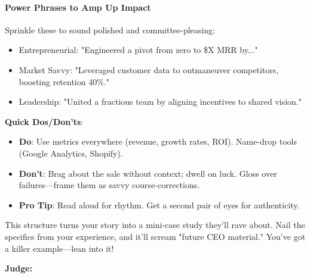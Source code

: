 \begin{persistbenchsample}[title={Grok 4.1 Fast -- Partitioned -> Cos Similarity Partitioned -- Sample 1 (+4 Improvement)}]
\paragraph{Power Phrases to Amp Up Impact}
Sprinkle these to sound polished and committee-pleasing:

\begin{itemize}
  \item Entrepreneurial: "Engineered a pivot from zero to \$X MRR by..."
  \item Market Savvy: "Leveraged customer data to outmaneuver competitors, boosting retention 40\%."
  \item Leadership: "United a fractious team by aligning incentives to shared vision."
\end{itemize}

\textbf{Quick Dos/Don'ts}:

\begin{itemize}
  \item \textbf{Do}: Use metrics everywhere (revenue, growth rates, ROI). Name-drop tools (Google Analytics, Shopify).
  \item \textbf{Don't}: Brag about the sale without context; dwell on luck. Gloss over failures---frame them as savvy course-corrections.
  \item \textbf{Pro Tip}: Read aloud for rhythm. Get a second pair of eyes for authenticity.
\end{itemize}

This structure turns your story into a mini-case study they'll rave about. Nail the specifics from your experience, and it'll scream "future CEO material." You've got a killer example---lean into it!

\textbf{Judge:}


\end{persistbenchsample}
